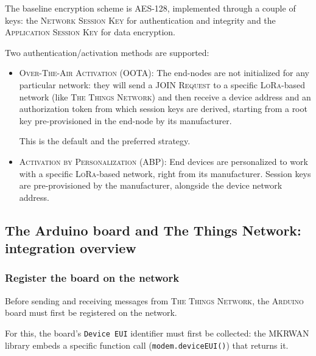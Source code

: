 \documentclass[a4paper,11pt]{article} %
\begin{document}
    \smallskip

    The baseline encryption scheme is \textsc{AES-128}, implemented through a couple of keys: the \textsc{Network Session Key} for authentication and integrity and the \textsc{Application Session Key} for data encryption.

    \smallskip

    Two authentication/activation methods are supported:

    \begin{itemize}
        \item \textsc{Over-The-Air Activation (OOTA)}: The end-nodes are not initialized for any particular network: they will send a \textsc{JOIN Request} to a specific \textsc{LoRa}-based network (like \textsc{The Things Network}) and then receive a device address and an authorization token from which session keys are derived, starting from a root key pre-provisioned in the end-node by its manufacturer.

        This is the default and the preferred strategy.
        \item \textsc{Activation by Personalization (ABP)}: End devices are personalized to work with a specific \textsc{LoRa}-based network, right from its manufacturer.
        Session keys are pre-provisioned by the manufacturer, alongside the device network address.
    \end{itemize}

    \subsection{The Arduino board and The Things Network: integration overview}\label{subsec:the-arduino-board-and-the-things-network:integration-overview}

    \subsubsection{Register the board on the network}

    Before sending and receiving messages from \textsc{The Things Network}, the \textsc{Arduino} board must first be registered on the network.

    \smallskip

    For this, the board's \texttt{Device EUI} identifier must first be collected: the \textsc{MKRWAN} library embeds a specific function call (\texttt{modem.deviceEUI()}) that returns it.

    \medskip
\end{document}
